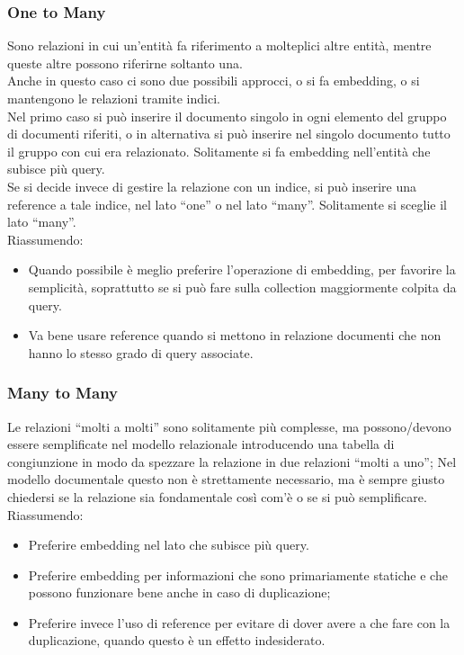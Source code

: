 \subsubsection{One to Many}
Sono relazioni in cui un'entità fa riferimento a molteplici altre entità, mentre queste altre possono riferirne soltanto una.\\
Anche in questo caso ci sono due possibili approcci, o si fa embedding, o si mantengono le relazioni tramite indici.\\
Nel primo caso si può inserire il documento singolo in ogni elemento del gruppo di documenti riferiti, o in alternativa si può inserire nel singolo documento tutto il gruppo con cui era relazionato. Solitamente si fa embedding nell'entità che subisce più query.\\
Se si decide invece di gestire la relazione con un indice, si può inserire una reference a tale indice, nel lato ``one'' o nel lato ``many''. Solitamente si sceglie il lato ``many''.\\
Riassumendo:
\begin{itemize}
    \item Quando possibile è meglio preferire l'operazione di embedding, per favorire la semplicità, soprattutto se si può fare sulla collection maggiormente colpita da query.
    \item Va bene usare reference quando si mettono in relazione documenti che non hanno lo stesso grado di query associate.
\end{itemize}

\subsubsection{Many to Many}
Le relazioni ``molti a molti'' sono solitamente più complesse, ma possono/devono essere semplificate nel modello relazionale introducendo una tabella di congiunzione in modo da spezzare la relazione in due relazioni ``molti a uno'';
Nel modello documentale questo non è strettamente necessario, ma è sempre giusto chiedersi se la relazione sia fondamentale così com'è o se si può semplificare.
Riassumendo:
\begin{itemize}
    \item Preferire embedding nel lato che subisce più query.
    \item Preferire embedding per informazioni che sono primariamente statiche e che possono funzionare bene anche in caso di duplicazione;
    \item Preferire invece l'uso di reference per evitare di dover avere a che fare con la duplicazione, quando questo è un effetto indesiderato.
\end{itemize}

